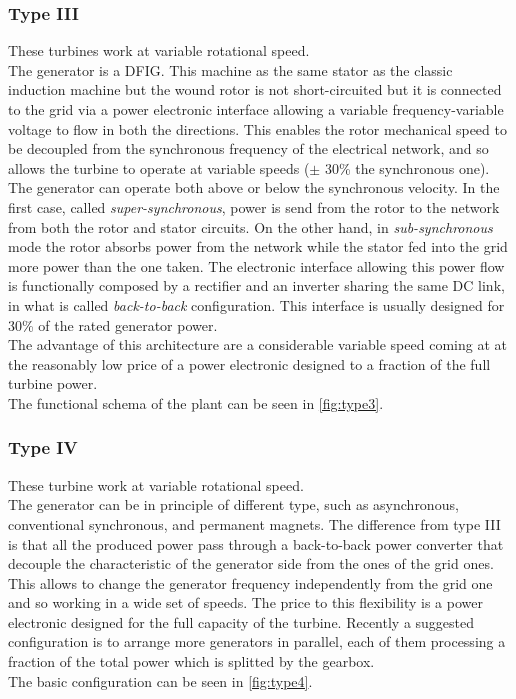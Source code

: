 \subsubsection{Type III}
These turbines work at variable rotational speed. \\
The generator is a \acrfull{DFIG}. This machine as the same stator as the classic induction machine but the wound rotor is not short-circuited but it is connected to the grid via a power electronic interface allowing a variable frequency-variable voltage to flow in both the directions. This enables the rotor mechanical speed to be decoupled from the synchronous frequency of the electrical network, and so allows the turbine to operate at variable speeds ($\pm$ 30\% the synchronous one). The generator can operate both above or below the synchronous velocity. In the first case, called \textit{super-synchronous}, power is send from the rotor to the network from both the rotor and stator circuits. On the other hand, in \textit{sub-synchronous} mode the rotor absorbs power from the network while the stator fed into the grid more power than the one taken. The electronic interface allowing this power flow is functionally composed by a rectifier and an inverter sharing the same DC link, in what is called \textit{back-to-back} configuration. This interface is usually designed for 30\% of the rated generator power.\\
The advantage of this architecture are a considerable variable speed coming at at the reasonably low price of a power electronic designed to a fraction of the full turbine power.\\  
The functional schema of the plant can be seen in \autoref{fig:type3}.

\subsubsection{Type IV}
These turbine work at variable rotational speed. \\
The generator can be in principle of different type, such as asynchronous, conventional synchronous, and permanent magnets. The difference from type III is that all the produced power pass through a back-to-back power converter that decouple the characteristic of the generator side from the ones of the grid ones. This allows to change the generator frequency independently from the grid one and so working in a wide set of speeds. The price to this flexibility is a power electronic designed for the full capacity of the turbine. Recently a suggested configuration is to arrange more generators in parallel, each of them processing a fraction of the total power which is splitted by the gearbox. \\
The basic configuration can be seen in \autoref{fig:type4}.

